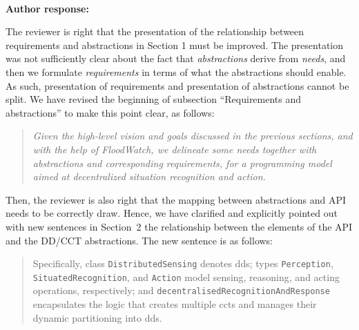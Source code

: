 \documentclass{article}
\newcounter{reviewer}
\newcommand{\reply}[1]{	\\[2pt]
	\textbf{Author response:} 	
	#1
}
\newcommand{\meta}[1]{{\color{blue}#1}}
\begin{document}
\reply{
The reviewer is right that the presentation of the relationship between requirements and abstractions in Section 1 must be improved. The presentation was not sufficiently clear about the fact that \emph{abstractions} derive from \emph{needs}, and then we formulate \emph{requirements} in terms of what the abstractions should enable. %
As such, presentation of requirements and presentation of abstractions cannot be split. We have revised the beginning of subsection ``Requirements and abstractions'' to make this point clear, as follows:
\begin{quote}
\emph{Given the high-level vision and goals discussed in the previous sections, and with the help of FloodWatch,
 we delineate some \emph{needs} together
 with \emph{abstractions} and corresponding \emph{requirements}, for a programming model 
 aimed at decentralized situation recognition and action.
}
\end{quote}



Then, the reviewer is also right that the mapping between abstractions and API needs to be correctly draw. Hence, we have clarified and explicitly pointed out with new sentences in Section~2 the relationship between the elements of the API and the DD/CCT abstractions. The new sentence is as follows:
	\begin{quote}
	Specifically, class \texttt{DistributedSensing} denotes \acsp{dd}; types \texttt{Perception}, \texttt{SituatedRecognition}, and \texttt{Action} model sensing, reasoning, and acting operations, respectively; and \texttt{decentralisedRecognitionAndResponse} encapsulates the logic that creates multiple \acsp{cct} and manages their dynamic partitioning into \acsp{dd}.
	\end{quote}
%
}
\end{document}
